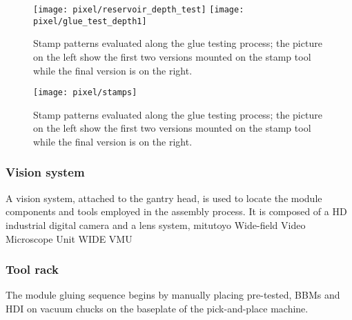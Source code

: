 \begin{figure}[!h]
  \centering
  \texttt{[image: pixel/reservoir\_depth\_test]}
  \texttt{[image: pixel/glue\_test\_depth1]}
  \caption[Stamp patterns]{Stamp patterns evaluated along the glue testing process; the picture on the left show the first two versions mounted on the stamp tool while the final version is on the right.}\label{fig:stamp_pattern}
\end{figure}



  
\eit

\begin{figure}[!h]
  \centering  
  \texttt{[image: pixel/stamps]} 
  \caption[Stamp patterns]{Stamp patterns evaluated along the glue testing process; the picture on the left show the first two versions mounted on the stamp tool while the final version is on the right.}\label{fig:stamp_pattern}
\end{figure}






\subsubsection*{Vision system}


A vision system, attached to the gantry head, is used to locate the module components and tools employed in the assembly process. It is composed of a HD industrial digital camera and a lens system,       
   mitutoyo Wide-field Video Microscope Unit WIDE VMU




\subsubsection*{Tool rack}






The module gluing sequence begins by manually placing pre-tested, BBMs and HDI on vacuum chucks on the baseplate of the pick-and-place machine.



